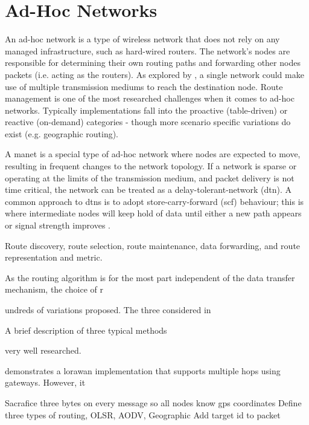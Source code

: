 \section{Ad-Hoc Networks}
An ad-hoc network is a type of wireless network that does not rely on any managed infrastructure, such as hard-wired routers. The network's nodes are responsible for determining their own routing paths and forwarding other nodes packets (i.e. acting as the routers). As explored by \cite{3YP:LORAWAN_MESH}, a single network could make use of multiple transmission mediums to reach the destination node. Route management is one of the most researched challenges when it comes to ad-hoc networks. Typically implementations fall into the proactive (table-driven) or reactive (on-demand) categories - though more scenario specific variations do exist (e.g. geographic routing). 

A \ac{manet} is a special type of ad-hoc network where nodes are expected to move, resulting in frequent changes to the network topology. If a network is sparse or operating at the limits of the transmission medium, and packet delivery is not time critical, the network can be treated as a delay-tolerant-network (\ac{dtn}). A common approach to \ac{dtn}s is to adopt store-carry-forward (\ac{scf}) behaviour; this is where intermediate nodes will keep hold of data until either a new path appears or signal strength improves \cite{3YP:DTNS}. 




\cite	{}
Route discovery, route selection, route maintenance, data forwarding, and route representation and metric. 


As the routing algorithm is for the most part independent of the data transfer mechanism, the choice of r 



undreds of variations proposed. The three considered in 




A brief description of three typical methods 

 very well researched. 




 demonstrates a \ac{lorawan} implementation that supports multiple hops using gateways. However, it



  Sacrafice three bytes on every message so all nodes know gps coordinates  
  Define three types of routing, OLSR, AODV, Geographic
  Add target id to packet